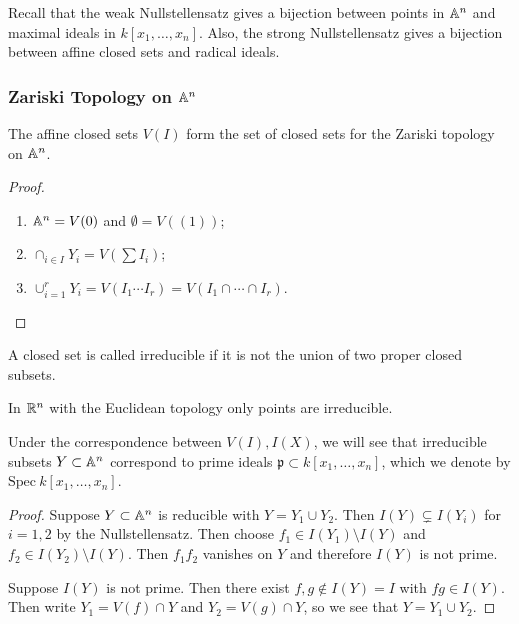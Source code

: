 \documentclass[twoside, 10pt]{article}
\begin{document}
    Recall that the weak Nullstellensatz gives a bijection between points in
    $\mathbb{A}^n$ and maximal ideals in $k[x_1, \ldots, x_n]$. Also, the strong
    Nullstellensatz gives a bijection between affine closed sets and radical
    ideals. 

    \subsubsection{Zariski Topology on $\mathbb{A}^n$} \begin{prop} The affine closed
        sets $V(I)$ form the set of closed sets for the Zariski topology on
        $\mathbb{A}^n$.  \begin{proof} \begin{enumerate} \item $\mathbb{A}^n = V(0)$ and
            $\emptyset = V((1))$; \item $\cap_{i \in I} Y_i = V(\sum I_i)$;
\item $\cup_{i=1}^r Y_i = V(I_1\cdots I_r) = V(I_1 \cap \cdots \cap I_r)$.
\end{enumerate} \end{proof} \end{prop}

    \begin{defn} A closed set is called irreducible if
    it is not the union of two proper closed subsets.  \end{defn}

    \begin{exm} In $\mathbb{R}^n$ with the Euclidean topology only points are
    irreducible.  \end{exm}

    \begin{thm} Under the correspondence between $V(I), I(X)$, we will see that
        irreducible subsets $Y \subset \mathbb{A}^n$ correspond to prime ideals
        $\mathfrak{p} \subset k[x_1, \ldots, x_n]$, which we denote by
        $\mathrm{Spec}\ k[x_1, \ldots, x_n]$.  \begin{proof} Suppose $Y \subset
            \mathbb{A}^n$ is reducible with $Y = Y_1 \cup Y_2$. Then $I(Y) \subsetneq
            I(Y_i)$ for $i=1,2$ by the Nullstellensatz. Then choose $f_1 \in
            I(Y_1) \setminus I(Y)$ and $f_2 \in I(Y_2) \setminus I(Y)$. Then
            $f_1f_2$ vanishes on $Y$ and therefore $I(Y)$ is not prime.

            Suppose $I(Y)$ is not prime. Then there exist $f,g \notin I(Y)=I$
        with $fg \in I(Y)$. Then write $Y_1 = V(f) \cap Y$ and $Y_2 = V(g) \cap
    Y$, so we see that $Y = Y_1 \cup Y_2$.  \end{proof} \end{thm}
\end{document}
